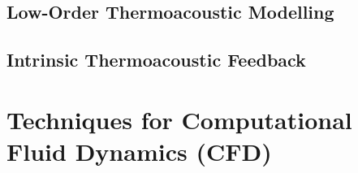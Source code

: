 \subsection{Low-Order Thermoacoustic Modelling}



\subsection{Intrinsic Thermoacoustic Feedback}





\section{Techniques for Computational Fluid Dynamics (CFD)}


\cite{orszag1970AnalyticalTheoriesTurbulence, domingo2023RecentDevelopmentsDNS, chen2011PetascaleDirectNumerical, yang2015LargeeddySimulationPresent, veynante2002TurbulentCombustionModeling, moin1998DirectNumericalSimulation, tennekes1972FirstCourseTurbulence}





